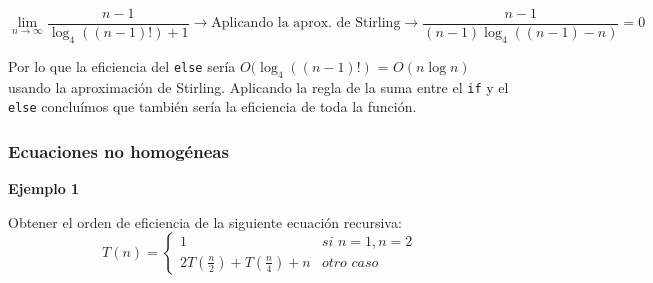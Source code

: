 \documentclass[10pt,a4paper,spanish]{report}
\theoremstyle{definition}
\theoremstyle{remark}
\begin{document}
\begin{displaymath}
\lim_{n \rightarrow \infty} \frac{n-1}{\log_4 ((n-1)!) + 1} \rightarrow {\text{Aplicando la aprox. de Stirling}} \rightarrow \frac{n-1}{(n-1)\log_4 ((n-1) - n)} = 0
\end{displaymath}

\begin{center}
\end{center}

Por lo que la eficiencia del \verb*|else| sería $O(\log_4 ((n-1)!)$ = $O(n\log n)$ usando la aproximación de Stirling. Aplicando la regla de la suma entre el \verb*|if| y el \verb*|else| concluímos que también sería la eficiencia de toda la función.

\subsubsection{\textcolor[rgb]{0.1,0.2,1}Ecuaciones no homogéneas}

\textbf{\textcolor[rgb]{0.1,0.2,1}Ejemplo 1}

Obtener el orden de eficiencia de la siguiente ecuación recursiva:
\begin{equation*}
T(n) = 
\begin{cases}
1 & \textit{si } n = 1, n = 2 \\
2T\left(\frac{n}{2}\right) + T\left(\frac{n}{4}\right) + n & \textit{otro caso}
\end{cases}
\end{equation*}
    
\end{document}
